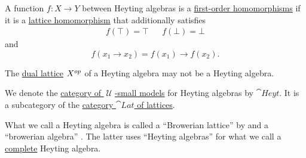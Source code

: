 \begin{definition}
\begin{thmenum}[resume=def:heyting_algebra]
     A function \( f: X \to Y \) between Heyting algebras is a \hyperref[def:first_order_homomorphism]{first-order homomorphisms} if it is a \hyperref[def:lattice/homomorphism]{lattice homomorphism} that additionally satisfies
    \begin{align}\label{eq:def:heyting_algebra/homomorphism/top_bottom}
      f(\top) = \top
      &&
      f(\bot) = \bot
    \end{align}
    and
    \begin{equation}\label{eq:def:heyting_algebra/homomorphism/operation}
      f(x_1 \rightarrow x_2) = f(x_1) \rightarrow f(x_2).
    \end{equation}

     The \hyperref[def:lattice/opposite]{dual lattice} \( X^{op} \) of a Heyting algebra may not be a Heyting algebra.

     We denote the \hyperref[def:category_of_small_first_order_models]{category of \( \mscrU \)-small models} for Heyting algebras by \( \cat{Heyt} \). It is a subcategory of the \hyperref[def:lattice/category]{category \( \cat{Lat} \) of lattices}.
  \end{thmenum}
\end{definition}
\begin{comments}
  \item What we call a Heyting algebra is called a \enquote{Browerian lattice} by  and a \enquote{browerian algebra} . The latter uses \enquote{Heyting algebras} for what we call a \hyperref[def:complete_lattice]{complete} Heyting algebra.
\end{comments}

